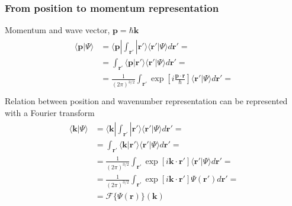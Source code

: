 \documentclass[letterpaper,10pt,english]{jupyterBook}
\begin{document}
\subsubsection{From position to momentum representation}
\label{\detokenize{ch/quantum-mechanics/intro:from-position-to-momentum-representation}}\label{\detokenize{ch/quantum-mechanics/intro:quantum-mechanics-intro-non-relativistic-basis-space-momentum}}
\sphinxAtStartPar
Momentum and wave vector, \(\mathbf{p} = \hbar \mathbf{k}\)
\begin{equation*}
\begin{split}\begin{aligned}
  \langle \mathbf{p} | \Psi \rangle
  & = \langle \mathbf{p} | \int_{\mathbf{r}'} | \mathbf{r}' \rangle \langle \mathbf{r}' | \Psi\rangle d \mathbf{r}' = \\
  & =   \int_{\mathbf{r}'} \langle \mathbf{p} | \mathbf{r}' \rangle \langle \mathbf{r}' | \Psi\rangle d \mathbf{r}' = \\
  & = \frac{1}{(2\pi)^{3/2}} \int_{\mathbf{r}'} \exp \left[ i \frac{\mathbf{p} \cdot \mathbf{r}}{\hbar} \right] \langle \mathbf{r}' | \Psi\rangle d \mathbf{r}' = \\
\end{aligned}\end{split}
\end{equation*}
\sphinxAtStartPar
Relation between position and wave\sphinxhyphen{}number representation can be represented with a Fourier transform
\begin{equation*}
\begin{split}\begin{aligned}
  \langle \mathbf{k} | \Psi \rangle
  & = \langle \mathbf{k} | \int_{\mathbf{r}'} | \mathbf{r}' \rangle \langle \mathbf{r}' | \Psi\rangle d \mathbf{r}' = \\
  & =   \int_{\mathbf{r}'} \langle \mathbf{k} | \mathbf{r}' \rangle \langle \mathbf{r}' | \Psi\rangle d \mathbf{r}' = \\
  & = \frac{1}{(2\pi)^{3/2}} \int_{\mathbf{r}'} \exp \left[ i \mathbf{k} \cdot \mathbf{r}' \right] \langle \mathbf{r}' | \Psi\rangle d \mathbf{r}' = \\
  & = \frac{1}{(2\pi)^{3/2}} \int_{\mathbf{r}'} \exp \left[ i \mathbf{k} \cdot \mathbf{r}' \right] \Psi(\mathbf{r}') d \mathbf{r}' = \\
  & = \mathscr{F}\{ \Psi(\mathbf{r}) \} (\mathbf{k})
\end{aligned}\end{split}
\end{equation*}
\end{document}
